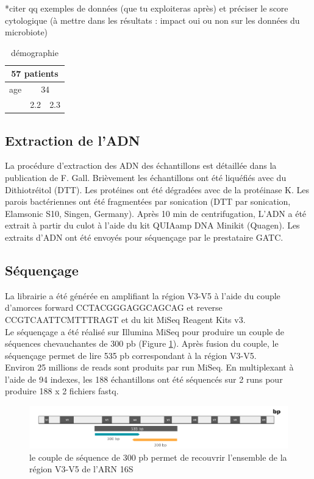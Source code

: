 \documentclass[12pt,a4paper]{article}
\begin{document}
*citer qq exemples de données (que tu exploiteras après) et préciser le score
cytologique (à mettre dans les résultats : impact oui ou non sur les données du microbiote)

\begin{table}[h]
\centering
   \caption{démographie}
   \begin{tabular}{|l|c|c}
        \hline
   \multicolumn{3}{|c|}{     57 patients     } \\
    \hline
    age & \multicolumn{2}{|c|}{34}  \\
    \hline

        & 2.2 & 2.3 \\
    \hline
   \end{tabular}
\end{table}

\subsection{Extraction de l’ADN}

La procédure d'extraction des ADN des échantillons est détaillée dans la publication de  F. Gall\cite{LeGall}. Brièvement les échantillons ont été liquéfiés avec du Dithiotréitol (DTT). Les protéines ont été dégradées avec de la protéinase K.
Les parois bactériennes ont été fragmentées par sonication (DTT par sonication, Elamsonic S10, Singen, Germany). Après 10 min de centrifugation, L’ADN a été extrait à partir du culot à l'aide du kit QUIAamp DNA Minikit (Quagen).
Les extraits d’ADN ont été envoyés pour séquençage par le prestataire GATC.

\subsection{Séquençage}
La librairie a été générée en amplifiant la région V3-V5 à l’aide du couple d’amorces forward CCTACGGGAGGCAGCAG et reverse CCGTCAATTCMTTTRAGT et du kit MiSeq Reagent Kits v3. \\
Le séquençage a été réalisé sur Illumina MiSeq pour produire un couple de séquences chevauchantes de 300 pb (Figure \ref{illumina}). Après fusion du couple, le séquençage permet de lire  535 pb correspondant à la région V3-V5.\\
Environ 25 millions de reads sont produits par run MiSeq. En multiplexant à l’aide de 94 indexes, les 188 échantillons ont été séquencés sur 2 runs pour produire 188 x 2 fichiers fastq.

\begin{figure}[ht]
\begin{center}
\includegraphics[scale=0.6]{img/illumina.png}\hfill
\end{center}
\caption{le couple de séquence de 300 pb permet de recouvrir l'ensemble de la région V3-V5 de l'ARN 16S}
\label{illumina}
\end{figure}
\end{document}
